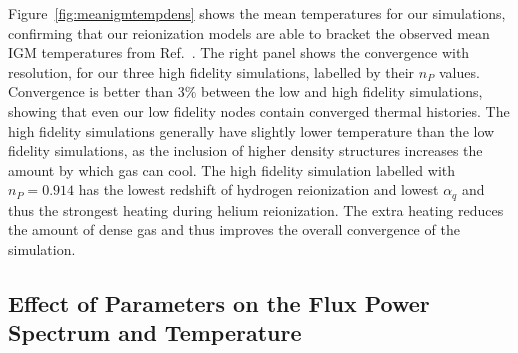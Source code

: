 \documentclass[a4paper,11pt]{article}
\begin{document}
Figure~\ref{fig:meanigmtempdens} shows the mean temperatures for our simulations, confirming that our reionization models are able to bracket the observed mean IGM temperatures from Ref.~\cite{Gaikwad:2021}.
The right panel shows the convergence with resolution, for our three high fidelity simulations, labelled by their $n_P$ values. Convergence is better than $3\%$ between the low and high fidelity simulations, showing that even our low fidelity nodes contain converged thermal histories.
The high fidelity simulations generally have slightly lower temperature than the low fidelity simulations, as the inclusion of higher density structures increases the amount by which gas can cool. The high fidelity simulation labelled with $n_P=0.914$ has the lowest redshift of hydrogen reionization and lowest $\alpha_q$ and thus the strongest heating during helium reionization. The extra heating reduces the amount of dense gas and thus improves the overall convergence of the simulation.



\subsection{Effect of Parameters on the Flux Power Spectrum and Temperature}
\label{sec:singleparams}
\end{document}
